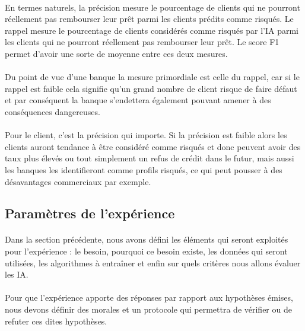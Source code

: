 \documentclass[10pt, french, a4paper]{report}
\begin{document}
\paragraph{}
En termes naturels, la précision mesure le pourcentage de clients qui ne pourront réellement pas rembourser leur prêt parmi les clients prédits comme risqués. Le rappel mesure le pourcentage de clients considérés comme risqués par l'IA parmi les clients qui ne pourront réellement pas rembourser leur prêt. Le score F1 permet d'avoir une sorte de moyenne entre ces deux mesures.

\paragraph{}
Du point de vue d'une banque la mesure primordiale est celle du rappel, car si le rappel est faible cela signifie qu'un grand nombre de client risque de faire défaut et par conséquent la banque s'endettera également pouvant amener à des conséquences dangereuses.

\paragraph{}
Pour le client, c'est la précision qui importe. Si la précision est faible alors les clients auront tendance à être considéré comme risqués et donc peuvent avoir des taux plus élevés ou tout simplement un refus de crédit dans le futur, mais aussi les banques les identifieront comme profils risqués, ce qui peut pousser à des désavantages commerciaux par exemple.


\subsection{Paramètres de l'expérience}

\paragraph{}
Dans la section précédente, nous avons défini les éléments qui seront exploités pour l'expérience : le besoin, pourquoi ce besoin existe, les données qui seront utilisées, les algorithmes à entraîner et enfin sur quels critères nous allons évaluer les IA.

\paragraph{}
Pour que l'expérience apporte des réponses par rapport aux hypothèses émises, nous devons définir des morales et un protocole qui permettra de vérifier ou de refuter ces dites hypothèses.
\end{document}
